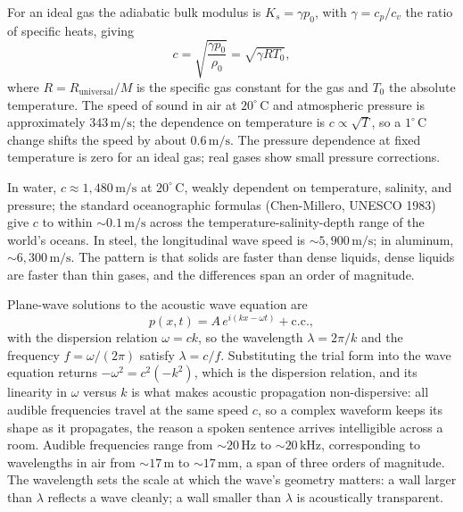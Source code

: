 For an ideal gas the adiabatic bulk modulus is $K_s = \gamma p_0$,
with $\gamma = c_p/c_v$ the ratio of specific heats, giving
\[
c = \sqrt{\frac{\gamma p_0}{\rho_0}} = \sqrt{\gamma R T_0},
\]
where $R = R_{\text{universal}}/M$ is the specific gas constant for
the gas and $T_0$ the absolute temperature. The speed of sound in
air at $20^{\circ}\,\mathrm{C}$ and atmospheric pressure is
approximately $343\,\si{\meter\per\second}$; the dependence on
temperature is $c \propto \sqrt{T}$, so a $1^{\circ}\,\mathrm{C}$
change shifts the speed by about $0.6\,\si{\meter\per\second}$. The
pressure dependence at fixed temperature is zero for an ideal gas;
real gases show small pressure corrections.

In water, $c \approx 1{,}480\,\si{\meter\per\second}$ at $20^{\circ}\,
\mathrm{C}$, weakly dependent on temperature, salinity, and pressure;
the standard oceanographic formulas (Chen-Millero, UNESCO 1983) give
$c$ to within $\sim 0.1\,\si{\meter\per\second}$ across the
temperature-salinity-depth range of the world's oceans. In steel,
the longitudinal wave speed is $\sim 5{,}900\,\si{\meter\per\second}$;
in aluminum, $\sim 6{,}300\,\si{\meter\per\second}$. The pattern is
that solids are faster than dense liquids, dense liquids are faster
than thin gases, and the differences span an order of magnitude.

Plane-wave solutions to the acoustic wave equation are
\[
p(x, t) = A\,e^{i(kx - \omega t)} + \text{c.c.},
\]
with the dispersion relation $\omega = c k$, so the wavelength
$\lambda = 2\pi/k$ and the frequency $f = \omega/(2\pi)$ satisfy
$\lambda = c/f$. Substituting the trial form into the wave equation
returns $-\omega^2 = c^2(-k^2)$, which is the dispersion relation, and
its linearity in $\omega$ versus $k$ is what makes acoustic propagation
non-dispersive: all audible frequencies travel at the same speed $c$, so
a complex waveform keeps its shape as it propagates, the reason a spoken
sentence arrives intelligible across a room. Audible frequencies range
from $\sim 20\,\si{\hertz}$ to $\sim 20\,\si{\kilo\hertz}$,
corresponding to wavelengths in air from $\sim 17\,\si{\meter}$ to
$\sim 17\,\si{\milli\meter}$, a span of three orders of magnitude. The
wavelength sets the scale at which the wave's geometry matters: a wall
larger than $\lambda$ reflects a wave cleanly; a wall smaller than
$\lambda$ is acoustically transparent.

